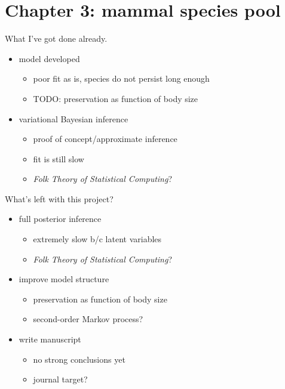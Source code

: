 \documentclass{beamer}
\begin{document}
\section{Chapter 3: mammal species pool}
\begin{frame}
  \begin{block}{What I've got done already.}
    \begin{itemize}
      \item model developed
        \begin{itemize}
          \item poor fit as is, species do not persist long enough
          \item TODO: preservation as function of body size
        \end{itemize}
      \item variational Bayesian inference
        \begin{itemize}
          \item proof of concept/approximate inference
          \item fit is still slow
          \item \textit{Folk Theory of Statistical Computing}?
        \end{itemize}
    \end{itemize}
  \end{block}
\end{frame}

\begin{frame}
  \begin{block}{What's left with this project?}
    \begin{itemize}
      \item full posterior inference
        \begin{itemize}
          \item extremely slow b/c latent variables
          \item \textit{Folk Theory of Statistical Computing}?
        \end{itemize}
      \item improve model structure
        \begin{itemize}
          \item preservation as function of body size
          \item second-order Markov process?
        \end{itemize}
      \item write manuscript
        \begin{itemize}
          \item no strong conclusions yet
          \item journal target?
        \end{itemize}
    \end{itemize}
  \end{block}
\end{frame}
\end{document}
